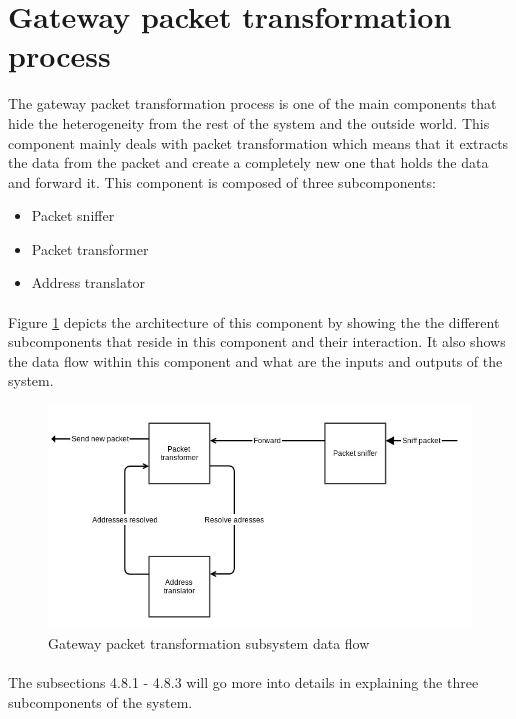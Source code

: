 \documentclass[oneside,12pt,a4paper,final]{book}
\begin{document}
\section{Gateway packet transformation process}
The gateway packet transformation process is one of the main components that hide the heterogeneity from the rest of the system and the outside world. This component mainly deals with packet transformation which means that it extracts the data from the packet and create a completely new one that holds the data and forward it. This component is composed of three subcomponents:
\begin{itemize}
\item Packet sniffer
\item Packet transformer
\item Address translator
\end{itemize}
\paragraph{}
Figure \ref{fig:gateway_transformation} depicts the architecture of this component by showing the the different subcomponents that reside in this component and their interaction. It also shows the data flow within this component and what are the inputs and outputs of the system.

\begin{figure}[htbp]
\centering
\includegraphics[scale=0.6]{img/packet_transformation.jpg}
\caption{Gateway packet transformation subsystem data flow}
\label{fig:gateway_transformation}
\end{figure}
\paragraph{}
The subsections 4.8.1 - 4.8.3 will go more into details in explaining the three subcomponents of the system.
\end{document}
